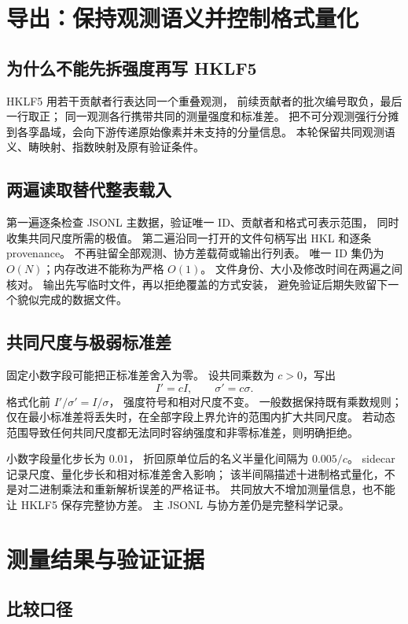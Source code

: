 \documentclass[UTF8,11pt,a4paper,fontset=fandol]{ctexart}
\begin{document}
\section{导出：保持观测语义并控制格式量化}

\subsection{为什么不能先拆强度再写 HKLF5}

HKLF5 用若干贡献者行表达同一个重叠观测，
前续贡献者的批次编号取负，最后一行取正；
同一观测各行携带共同的测量强度和标准差\cite{parkin2021}。
把不可分观测强行分摊到各孪晶域，会向下游传递原始像素并未支持的分量信息。
本轮保留共同观测语义、畴映射、指数映射及原有验证条件。

\subsection{两遍读取替代整表载入}

第一遍逐条检查 JSONL 主数据，验证唯一 ID、贡献者和格式可表示范围，
同时收集共同尺度所需的极值。
第二遍沿同一打开的文件句柄写出 HKL 和逐条 provenance。
不再驻留全部观测、协方差载荷或输出行列表。
唯一 ID 集仍为 $O(N)$；内存改进不能称为严格 $O(1)$。
文件身份、大小及修改时间在两遍之间核对。
输出先写临时文件，再以拒绝覆盖的方式安装，
避免验证后期失败留下一个貌似完成的数据文件。

\subsection{共同尺度与极弱标准差}

固定小数字段可能把正标准差舍入为零。
设共同乘数为 $c>0$，写出
\[
I'=cI,\qquad \sigma'=c\sigma .
\]
格式化前 $I'/\sigma'=I/\sigma$，
强度符号和相对尺度不变。
一般数据保持既有乘数规则；
仅在最小标准差将丢失时，在全部字段上界允许的范围内扩大共同尺度。
若动态范围导致任何共同尺度都无法同时容纳强度和非零标准差，则明确拒绝。

小数字段量化步长为 $0.01$，
折回原单位后的名义半量化间隔为 $0.005/c$。
sidecar 记录尺度、量化步长和相对标准差舍入影响；
该半间隔描述十进制格式量化，不是对二进制乘法和重新解析误差的严格证书。
共同放大不增加测量信息，也不能让 HKLF5 保存完整协方差。
主 JSONL 与协方差仍是完整科学记录。

\section{测量结果与验证证据}

\subsection{比较口径}
\end{document}
